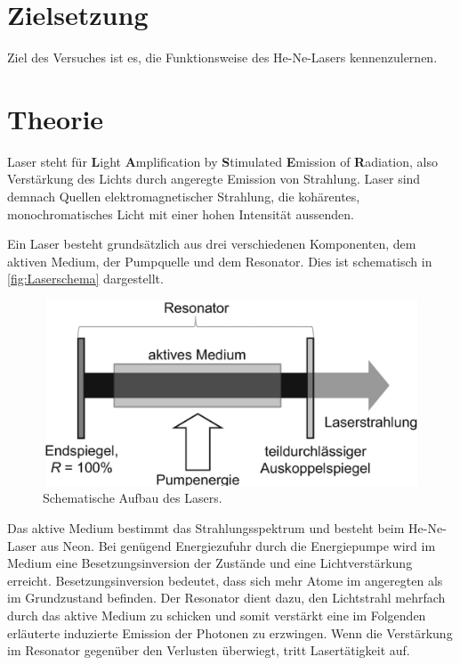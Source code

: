 \section{Zielsetzung}
\label{sec:Zielsetzung}
Ziel des Versuches ist es, die Funktionsweise des He-Ne-Lasers kennenzulernen.

\section{Theorie}
\label{sec:Theorie}

Laser steht für \textbf{L}ight \textbf{A}mplification by \textbf{S}timulated \textbf{E}mission of \textbf{R}adiation, also
Verstärkung des Lichts durch angeregte Emission von Strahlung.
Laser sind demnach Quellen elektromagnetischer Strahlung, die kohärentes, monochromatisches Licht mit einer hohen Intensität aussenden.


Ein Laser besteht grundsätzlich aus drei verschiedenen Komponenten, dem aktiven Medium, der Pumpquelle und dem Resonator.
Dies ist schematisch in \autoref{fig:Laserschema} dargestellt.\\

\begin{figure}[H]
    \centering
    \includegraphics[scale=0.7]{Abbildungen/schemalaser.png}
    \caption{Schematische Aufbau des Lasers.\cite{Gerhard2020}}
    \label{fig:Laserschema}
\end{figure}

Das aktive Medium bestimmt das Strahlungsspektrum und besteht beim He-Ne-Laser aus Neon.
Bei genügend Energiezufuhr durch die Energiepumpe wird im Medium eine Besetzungsinversion der Zustände und eine Lichtverstärkung erreicht.
Besetzungsinversion bedeutet, dass sich mehr Atome im angeregten als im Grundzustand befinden.
Der Resonator dient dazu, den Lichtstrahl mehrfach durch das aktive Medium zu schicken und somit verstärkt eine im Folgenden erläuterte
induzierte Emission der Photonen zu erzwingen.
Wenn die Verstärkung im Resonator gegenüber den Verlusten überwiegt, tritt Lasertätigkeit auf.\\


